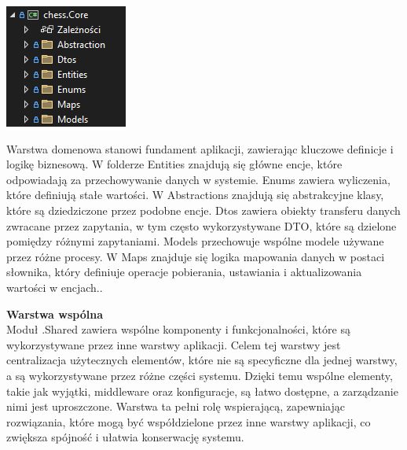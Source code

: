 \documentclass[12pt,a4paper]{article}
\begin{document}
\vspace{0.5cm}
\begin{minipage}[t]{0.45\textwidth}
    \vspace{0pt}
    \centering
    \includegraphics[width=\linewidth]{zdj/struktura_back_core.png} 
\end{minipage}
\hfill
\begin{minipage}[t]{0.45\textwidth}
    \vspace{0pt}
    \raggedright
    Warstwa domenowa stanowi fundament aplikacji, zawierając kluczowe definicje i logikę biznesową. W folderze Entities znajdują się główne encje, które odpowiadają za przechowywanie danych w systemie. Enums zawiera wyliczenia, które definiują stałe wartości. W Abstractions znajdują się abstrakcyjne klasy, które są dziedziczone przez podobne encje. Dtos zawiera obiekty transferu danych zwracane przez zapytania, w tym często wykorzystywane DTO, które są dzielone pomiędzy różnymi zapytaniami. Models przechowuje wspólne modele używane przez różne procesy. W Maps znajduje się logika mapowania danych w postaci słownika, który definiuje operacje pobierania, ustawiania i aktualizowania wartości w encjach..
\end{minipage}
\vspace{0.5cm}

\textbf{Warstwa wspólna }\\
Moduł .Shared zawiera wspólne komponenty i funkcjonalności, które są wykorzystywane przez inne warstwy aplikacji. Celem tej warstwy jest centralizacja użytecznych elementów, które nie są specyficzne dla jednej warstwy, a są wykorzystywane przez różne części systemu. Dzięki temu wspólne elementy, takie jak wyjątki, middleware oraz konfiguracje, są łatwo dostępne, a zarządzanie nimi jest uproszczone. Warstwa ta pełni rolę wspierającą, zapewniając rozwiązania, które mogą być współdzielone przez inne warstwy aplikacji, co zwiększa spójność i ułatwia konserwację systemu.
\end{document}
